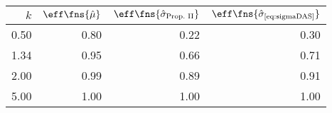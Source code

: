 \begin{tabular}{rrrr}
  \hline
$k$ & $\eff\fns{\hat\mu}$ &
$\eff\fns{\hat\sigma_\text{Prop.~II}}$ &
$\eff\fns{\hat\sigma_\text{\eqref{eq:sigmaDAS}}}$ \\ 
  \hline
  0.50 & 0.80 & 0.22 & 0.30\\ 
  1.34 & 0.95 & 0.66 & 0.71\\ 
  2.00 & 0.99 & 0.89 & 0.91\\ 
  5.00 & 1.00 & 1.00 & 1.00\\ 
   \hline
\end{tabular}
